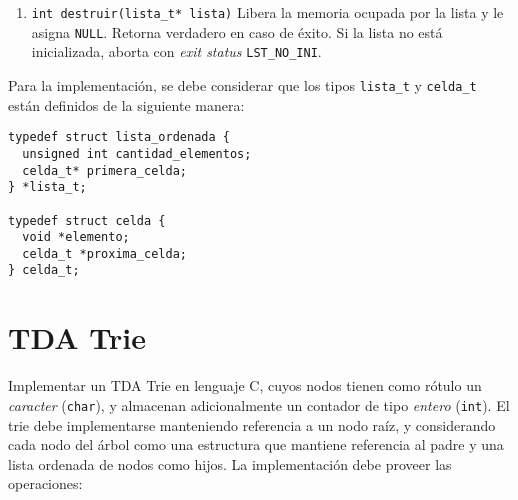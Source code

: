 \documentclass[12pt,a4paper]{article}
\begin{document}
\begin{enumerate}
	
	\item \texttt{int destruir(lista\_t* lista)} Libera la memoria ocupada
	por la lista y le asigna \texttt{NULL}. Retorna verdadero en caso de éxito.
	Si la lista no está inicializada, aborta con \emph{exit status}
	\texttt{LST\_NO\_INI}.
	
\end{enumerate}

Para la implementación, se debe considerar que los tipos \texttt{lista\_t} y \texttt{celda\_t} están definidos de la siguiente manera:

\begin{verbatim}
typedef struct lista_ordenada {
  unsigned int cantidad_elementos;
  celda_t* primera_celda;
} *lista_t;

typedef struct celda {
  void *elemento;
  celda_t *proxima_celda;
} celda_t;
\end{verbatim}

\section{TDA Trie}

Implementar un TDA Trie en lenguaje C, cuyos nodos tienen como rótulo un \emph{caracter} (\texttt{char}), y almacenan adicionalmente un contador de tipo \emph{entero} (\texttt{int}). El trie debe implementarse manteniendo referencia a un nodo raíz, y considerando cada nodo del árbol como una estructura que mantiene referencia al padre y una lista ordenada de nodos como hijos. La implementación debe proveer las operaciones:
\end{document}
